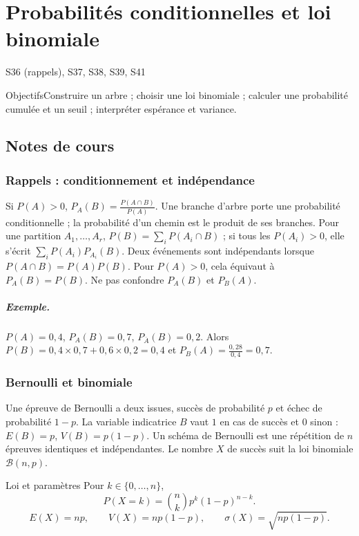 \setcounter{chapter}{12}\chapter{Probabilités conditionnelles et loi binomiale}\label{ch:13}

{\small\sffamily\color{teal}S36 (rappels), S37, S38, S39, S41\par}

\begin{retenir}{Objectifs}Construire un arbre ; choisir une loi binomiale ; calculer une probabilité cumulée et un seuil ; interpréter espérance et variance.\end{retenir}

\section{Notes de cours}
\subsection{Rappels : conditionnement et indépendance}
Si $P(A)>0$, $P_A(B)=\frac{P(A\cap B)}{P(A)}$. Une branche d'arbre porte une probabilité conditionnelle ; la probabilité d'un chemin est le produit de ses branches. Pour une partition $A_1,\ldots,A_r$, $P(B)=\sum_iP(A_i\cap B)$ ; si tous les $P(A_i)>0$, elle s'écrit $\sum_iP(A_i)P_{A_i}(B)$.
Deux événements sont indépendants lorsque $P(A\cap B)=P(A)P(B)$. Pour $P(A)>0$, cela équivaut à $P_A(B)=P(B)$. Ne pas confondre $P_A(B)$ et $P_B(A)$.
\paragraph{Exemple.} $P(A)=0{,}4$, $P_A(B)=0{,}7$, $P_{\overline A}(B)=0{,}2$. Alors $P(B)=0{,}4\times0{,}7+0{,}6\times0{,}2=0{,}4$ et $P_B(A)=\frac{0{,}28}{0{,}4}=0{,}7$.
\subsection{Bernoulli et binomiale}
Une épreuve de Bernoulli a deux issues, succès de probabilité $p$ et échec de probabilité $1-p$. La variable indicatrice $B$ vaut $1$ en cas de succès et $0$ sinon : $E(B)=p$, $V(B)=p(1-p)$.
Un schéma de Bernoulli est une répétition de $n$ épreuves identiques et indépendantes. Le nombre $X$ de succès suit la loi binomiale $\mathcal B(n,p)$.
\begin{retenir}{Loi et paramètres}
Pour $k\in\{0,\ldots,n\}$,
\[P(X=k)=\binom nk p^k(1-p)^{n-k}.\]\[E(X)=np,\qquad V(X)=np(1-p),\qquad\sigma(X)=\sqrt{np(1-p)}.\]
\end{retenir}
